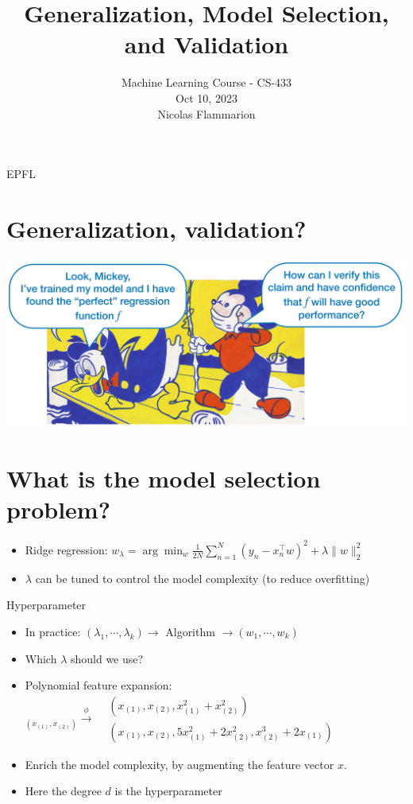 \documentclass[10pt]{article}
\title{Generalization, Model Selection, and Validation }
\author{Machine Learning Course - CS-433\\
Oct 10, 2023\\
Nicolas Flammarion}
\date{}
\begin{document}
\maketitle
EPFL

\section*{Generalization, validation?}
\begin{center}
\includegraphics[max width=\textwidth]{2023_12_30_b4c98a1755bce7fa9493g-02}
\end{center}

\section*{What is the model selection problem?}
\begin{itemize}
  \item Ridge regression: $w_{\lambda}=\arg \min _{w} \frac{1}{2 N} \sum_{n=1}^{N}\left(y_{n}-x_{n}^{\top} w\right)^{2}+\lambda\|w\|_{2}^{2}$
  \item $\lambda$ can be tuned to control the model complexity (to reduce overfitting)
\end{itemize}

Hyperparameter

\begin{itemize}
  \item In practice: $\left(\lambda_{1}, \cdots, \lambda_{k}\right) \longrightarrow$ Algorithm $\longrightarrow\left(w_{1}, \cdots, w_{k}\right)$

  \item Which $\lambda$ should we use?

  \item Polynomial feature expansion: ${ }_{\left(x_{(1)}, x_{(2)}\right)} \xrightarrow{\phi} \begin{aligned} & \left(x_{(1)}, x_{(2)}, x_{(1)}^{2}+x_{(2)}^{2}\right) \\ & \left(x_{(1)}, x_{(2)}, 5 x_{(1)}^{2}+2 x_{(2)}^{2}, x_{(2)}^{3}+2 x_{(1)}\right)\end{aligned}$

  \item Enrich the model complexity, by augmenting the feature vector $x$.

  \item Here the degree $d$ is the hyperparameter

\end{itemize}
\end{document}
